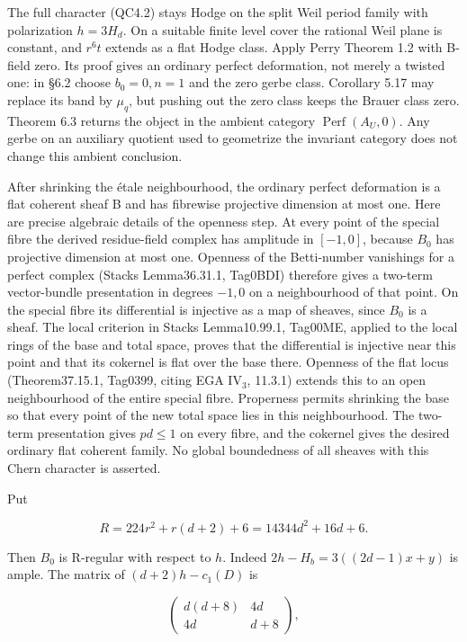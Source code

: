 The full character (QC4.2) stays Hodge on the split Weil period family
with polarization \(h=3H_d\). On a suitable finite level cover the
rational Weil plane is constant, and \(r^{6}t\) extends as a flat Hodge
class. Apply Perry Theorem 1.2 with B-field zero. Its proof gives an
ordinary perfect deformation, not merely a twisted one: in §6.2 choose
\(b_{0}=0,n=1\) and the zero gerbe class. Corollary 5.17 may replace its
band by \(\mu _q\), but pushing out the zero class keeps the Brauer
class zero. Theorem 6.3 returns the object in the ambient category
\(\operatorname{Perf}(A_U,0)\). Any gerbe on an auxiliary quotient used
to geometrize the invariant category does not change this ambient
conclusion.

After shrinking the étale neighbourhood, the ordinary perfect
deformation is a flat coherent sheaf B and has fibrewise projective
dimension at most one. Here are precise algebraic details of the
openness step. At every point of the special fibre the derived
residue-field complex has amplitude in \([-1,0]\), because \(B_{0}\) has
projective dimension at most one. Openness of the Betti-number
vanishings for a perfect complex (Stacks Lemma36.31.1, Tag0BDI)
therefore gives a two-term vector-bundle presentation in degrees
\(-1,0\) on a neighbourhood of that point. On the special fibre its
differential is injective as a map of sheaves, since \(B_{0}\) is a
sheaf. The local criterion in Stacks Lemma10.99.1, Tag00ME, applied to
the local rings of the base and total space, proves that the
differential is injective near this point and that its cokernel is flat
over the base there. Openness of the flat locus (Theorem37.15.1,
Tag0399, citing EGA IV\(_3\), 11.3.1) extends this to an open
neighbourhood of the entire special fibre. Properness permits shrinking
the base so that every point of the new total space lies in this
neighbourhood. The two-term presentation gives \(pd\le 1\) on every
fibre, and the cokernel gives the desired ordinary flat coherent family.
No global boundedness of all sheaves with this Chern character is
asserted.

Put

\[
 R=224r^2+r(d+2)+6=14344d^2+16d+6.
 \tag{QC4.3}
\]

Then \(B_{0}\) is R-regular with respect to \(h\). Indeed
\(2h-H_b=3((2d-1)x+y)\) is ample. The matrix of \((d+2)h-c_{1}(D)\) is

\[
 \begin{pmatrix}d(d+8)&4d\\4d&d+8\end{pmatrix},
\]

